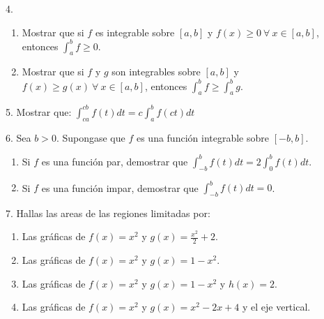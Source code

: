 \documentclass[12pt]{article}
\begin{document}
4.
\begin{enumerate}[\hspace{9px} a)]
    \item Mostrar que si $f$ es integrable sobre $[a,b]$ y \(f(x) \geq 0 \ \forall \ x \in [a,b]\), entonces \(\displaystyle\int_{a}^{b}f \geq 0\).
    
    \item Mostrar que si $f$ y $g$ son integrables sobre $[a,b]$ y \(f(x) \geq g(x) \ \forall \ x \in [a,b]\), entonces \(\displaystyle\int_{a}^{b}f \geq \displaystyle\int_{a}^{b}g\).

\end{enumerate}

5. Mostrar que: \quad \(\displaystyle\int_{ca}^{cb}f(t)dt=c\displaystyle\int_{a}^{b}f(ct)dt\)

6. Sea $b>0$. Supongase que $f$ es una funci\'on integrable sobre $[-b,b]$.

\begin{enumerate}[\hspace{9px} a)]
    \item Si $f$ es una funci\'on par, demostrar que \(\displaystyle\int_{-b}^{b}f(t)dt=2\int_{0}^{b}f(t)dt\).
    
    \item Si $f$ es una funci\'on impar, demostrar que \(\displaystyle\int_{-b}^{b}f(t)dt=0\).

\end{enumerate}

7. Hallas las areas de las regiones limitadas por:

\begin{enumerate}[\hspace{9px} a)]
    \item Las gr\'aficas de \(f(x)=x^2\) y \(g(x)=\frac{x^2}{2}+2\).
    
    \item Las gr\'aficas de \(f(x)=x^2\) y \(g(x)=1-x^2\).
    
    \item Las gr\'aficas de \(f(x)=x^2\) y \(g(x)=1-x^2\) y \(h(x)=2\).
    
    \item Las gr\'aficas de \(f(x)=x^2\) y \(g(x)=x^2-2x+4\) y el eje vertical.

\end{enumerate}
\end{document}

